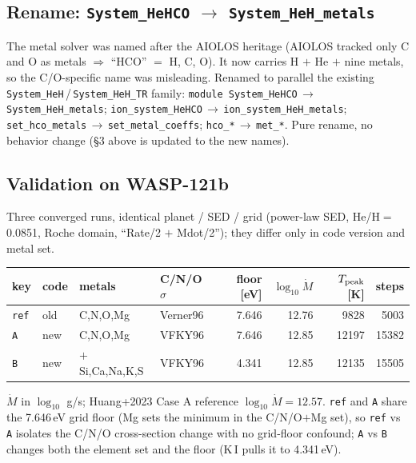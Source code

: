 \documentclass[english,a4paper]{kiseon_memo}
\begin{document}
\subsection{Rename: \texttt{System\_HeHCO} $\rightarrow$ \texttt{System\_HeH\_metals}}

The metal solver was named after the AIOLOS heritage (AIOLOS tracked only C and
O as metals $\Rightarrow$ ``HCO'' $=$ H, C, O). It now carries H $+$ He $+$ nine
metals, so the C/O-specific name was misleading. Renamed to parallel the
existing \verb|System_HeH|\,/\,\verb|System_HeH_TR| family:
\verb|module System_HeHCO|\,$\rightarrow$\,\verb|System_HeH_metals|;
\verb|ion_system_HeHCO|\,$\rightarrow$\,\verb|ion_system_HeH_metals|;
\verb|set_hco_metals|\,$\rightarrow$\,\verb|set_metal_coeffs|;
\verb|hco_*|\,$\rightarrow$\,\verb|met_*|. Pure rename, no behavior change
(\S3 above is updated to the new names).

\subsection{Validation on WASP-121b}

Three converged runs, identical planet / SED / grid (power-law SED,
He/H$=$0.0851, Roche domain, ``Rate/2 $+$ Mdot/2''); they differ only in code
version and metal set.

\begin{center}
\begin{tabular}{llllrrrr}
\hline
key & code & metals & C/N/O $\sigma$ & floor [eV] & $\log_{10}\dot M$ & $T_{\rm peak}$ [K] & steps \\
\hline
\texttt{ref} & old & C,N,O,Mg & Verner96 & 7.646 & 12.76 & 9828 & 5003 \\
\texttt{A}   & new & C,N,O,Mg & VFKY96   & 7.646 & 12.85 & 12197 & 15382 \\
\texttt{B}   & new & $+$Si,Ca,Na,K,S & VFKY96 & 4.341 & 12.85 & 12135 & 15505 \\
\hline
\end{tabular}
\end{center}

$\dot M$ in $\log_{10}$ g/s; Huang+2023 Case A reference $\log_{10}\dot M = 12.57$.
\texttt{ref} and \texttt{A} share the 7.646\,eV grid floor (Mg sets the minimum
in the C/N/O$+$Mg set), so \texttt{ref} vs \texttt{A} isolates the C/N/O
cross-section change with no grid-floor confound; \texttt{A} vs \texttt{B}
changes both the element set and the floor (K\,I pulls it to 4.341\,eV).
\end{document}
